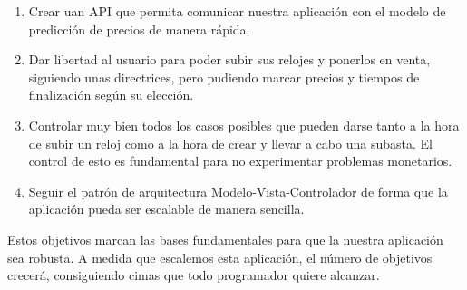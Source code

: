 \begin{enumerate}
	\item Crear uan API que permita comunicar nuestra aplicación con el modelo de predicción de precios de manera rápida.
	\item Dar libertad al usuario para poder subir sus relojes y ponerlos en venta, siguiendo unas directrices, pero pudiendo marcar precios y tiempos de finalización según su elección.
	\item Controlar muy bien todos los casos posibles que pueden darse tanto a la hora de subir un reloj como a la hora de crear y llevar a cabo una subasta. El control de esto es fundamental para no experimentar problemas monetarios.
	\item Seguir el patrón de arquitectura Modelo-Vista-Controlador de forma que la aplicación pueda ser escalable de manera sencilla.
\end{enumerate}

	Estos objetivos marcan las bases fundamentales para que la nuestra aplicación sea robusta. A medida que escalemos esta aplicación, el número de objetivos crecerá, consiguiendo cimas que todo programador quiere alcanzar.